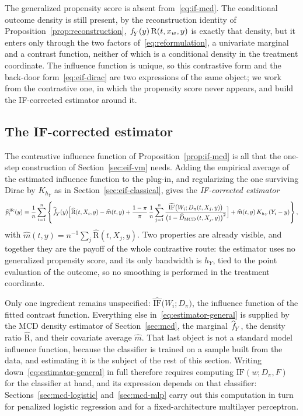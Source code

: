 \documentclass[11pt]{article}
\theoremstyle{plain}
\theoremstyle{definition}
\theoremstyle{remark}
\newcommand{\mcd}{\text{MCD}\,}
\newcommand{\pf}[1]{\ensuremath{\,\mathlarger{\textit{f}}_{#1}}}
\newcommand{\pfhat}[1]{\ensuremath{\,\mathlarger{\widehat{\textit{f}}}_{#1}}}
\newcommand{\ratio}{\ensuremath{\pi}}
\newcommand{\contrast}{D_{\ratio}}
\newcommand{\contrasthat}{\widehat{D}_{\mcd}}
\newcommand{\DensityRatio}{\text{R}}
\newcommand{\IF}{\mathrm{IF}}
\begin{document}
The generalized propensity score is absent from~\eqref{eq:if-mcd}. The conditional outcome
density is still present, by the reconstruction identity of
Proposition~\ref{prop:reconstruction}, $\pf{Y}(y)\,\DensityRatio(t,x_w,y)$ is exactly that
density, but it enters only through the two factors of~\eqref{eq:reformulation}, a univariate
marginal and a contrast function, neither of which is a conditional density in the treatment
coordinate. The influence function is unique, so this contrastive form and the back-door
form~\eqref{eq:eif-dirac} are two expressions of the same object; we work from the contrastive
one, in which the propensity score never appears, and build the IF-corrected estimator around it.

\subsection{The IF-corrected estimator}
\label{sec:mcd-estimator-form}

The contrastive influence function of Proposition~\ref{prop:if-mcd} is all that the one-step
construction of Section~\ref{sec:eif-vm} needs. Adding the empirical average of the estimated
influence function to the plug-in, and regularizing the one surviving Dirac by $K_{h_Y}$ as in
Section~\ref{sec:eif-classical}, gives the \emph{IF-corrected estimator}
\begin{equation}
\widehat p^{\,\mathrm{ifc}}_t(y)
= \frac{1}{n}\sum_{i=1}^{n} \left\{
\pfhat{Y}(y)\Big[
\widehat{\DensityRatio}(t,X_i,y) - \widehat m(t,y)
+ \frac{1-\ratio}{\ratio}\,\frac{1}{n}\sum_{j=1}^{n}
\frac{\widehat{\IF}\big(W_i;\contrast(t,X_j,y)\big)}{\big(1-\contrasthat(t,X_j,y)\big)^{2}}
\Big]
+ \widehat m(t,y)\, K_{h_Y}(Y_i - y)
\right\},
\label{eq:estimator-general}
\end{equation}
with $\widehat m(t,y) = n^{-1}\sum_{j} \widehat{\DensityRatio}(t,X_j,y)$. Two properties are
already visible, and together they are the payoff of the whole contrastive route: the estimator
uses no generalized propensity score, and its only bandwidth is $h_Y$, tied to the point
evaluation of the outcome, so no smoothing is performed in the treatment coordinate.

Only one ingredient remains unspecified: $\widehat{\IF}\big(W_i;\contrast\big)$, the influence
function of the fitted contrast function. Everything else in~\eqref{eq:estimator-general} is
supplied by the MCD density estimator of Section~\ref{sec:mcd}, the marginal
$\pfhat{Y}$, the density ratio $\widehat{\DensityRatio}$, and their covariate average
$\widehat m$. That last object is not a standard model influence function, because the classifier
is trained on a sample built from the data, and estimating it is the subject of the rest of
this section. Writing down~\eqref{eq:estimator-general} in full therefore requires computing
$\IF(w;\contrast,F)$ for the classifier at hand, and its expression depends on that classifier:
Sections~\ref{sec:mcd-logistic} and~\ref{sec:mcd-mlp} carry out this computation in turn for
penalized logistic regression and for a fixed-architecture multilayer perceptron.
\end{document}
